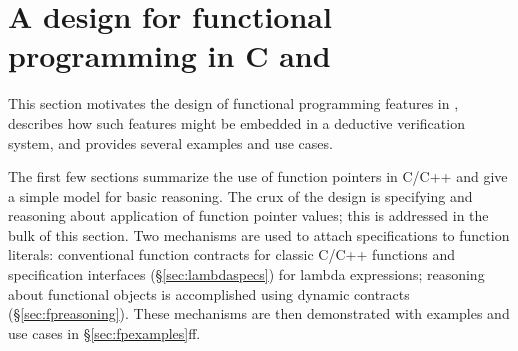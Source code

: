 \section{A design for functional programming in C and \lang}
\label{sec:functionalDiscussion}

This section motivates the design of functional programming features in \NAME, describes how such features might be embedded in a deductive verification system, and provides several examples and use cases.

The first few sections summarize the use of function pointers
in C/C++ and give a simple model for basic reasoning. 
The crux of the design is specifying and reasoning about application of 
function pointer values; this is addressed in the bulk of this
section.
Two mechanisms are used to attach specifications to function literals: conventional function contracts for classic C/C++ functions and 
specification interfaces (\S\ref{sec:lambdaspecs}) for lambda expressions; 
reasoning about functional objects is accomplished using
dynamic contracts (\S\ref{sec:fpreasoning}). 
These mechanisms are then demonstrated with examples and use cases in \S\ref{sec:fpexamples}ff.

 

